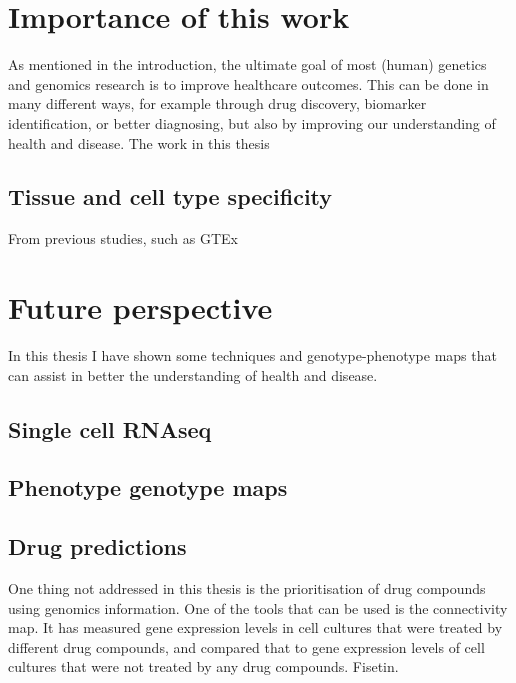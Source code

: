 \section{Importance of this work}
As mentioned in the introduction, the ultimate goal of most (human) genetics and genomics research is to improve healthcare outcomes. This can be done in many different ways, for example through drug discovery\cite{holmesHumanGeneticsDrug2019}, biomarker identification\cite{olivierNeedMultiOmicsBiomarker2019}, or better diagnosing\cite{hortonRecentDevelopmentsGenetic2019}, but also by improving our understanding of health and disease\cite{mcguireRoadAheadGenetics2020, claussnitzerBriefHistoryHuman2020e}. The work in this thesis 

\subsection{Tissue and cell type specificity}
From previous studies, such as GTEx\cite{lonsdaleGenotypeTissueExpressionGTEx2013}

\section{Future perspective}
In this thesis I have shown some techniques and genotype-phenotype maps that can assist in better the understanding of health and disease. 

\subsection{Single cell RNAseq}
\subsection{Phenotype genotype maps}
\subsection{Drug predictions}
One thing not addressed in this thesis is the prioritisation of drug compounds using genomics information. One of the tools that can be used is the connectivity map\cite{lambConnectivityMapUsing2006}. It has measured gene expression levels in cell cultures that were treated by different drug compounds, and compared that to gene expression levels of cell cultures that were not treated by any drug compounds. Fisetin\cite{gibbsHumanGenomeProject2020}. 